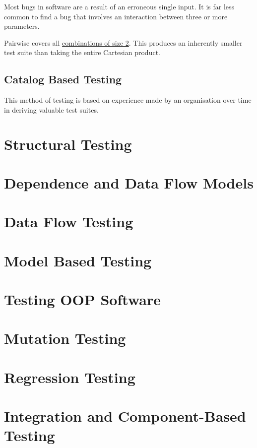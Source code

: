 \documentclass{article}
\begin{document}
Most bugs in software are a result of an erroneous single input. It is far less common to find a bug that involves an interaction between three or more parameters.

Pairwise covers all \underline{combinations of size 2}. This produces an inherently smaller test suite than taking the entire Cartesian product.

\subsection{Catalog Based Testing}

This method of testing is based on experience made by an organisation over time in deriving valuable test suites.

\section{Structural Testing}



\section{Dependence and Data Flow Models}

\section{Data Flow Testing}

\section{Model Based Testing}

\section{Testing OOP Software}

\section{Mutation Testing}

\section{Regression Testing}

\section{Integration and Component-Based Testing}
\end{document}
